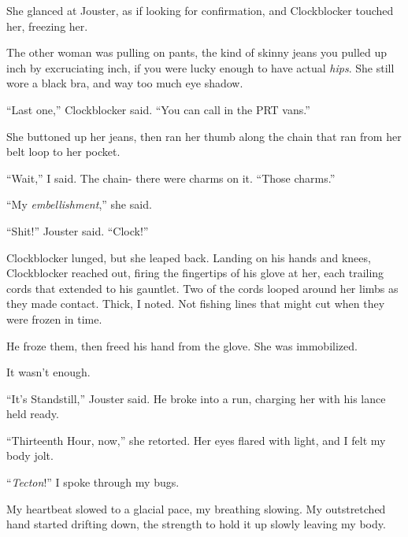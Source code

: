 She glanced at Jouster, as if looking for confirmation, and Clockblocker touched her, freezing her.



The other woman was pulling on pants, the kind of skinny jeans you pulled up inch by excruciating inch, if you were lucky enough to have actual \emph{hips}.  She still wore a black bra, and way too much eye shadow.



``Last one,'' Clockblocker said.  ``You can call in the PRT vans.''



She buttoned up her jeans, then ran her thumb along the chain that ran from her belt loop to her pocket.



``Wait,'' I said.  The chain- there were charms on it.  ``Those charms.''



``My \emph{embellishment},'' she said.



``Shit!'' Jouster said.  ``Clock!''



Clockblocker lunged, but she leaped back.  Landing on his hands and knees, Clockblocker reached out, firing the fingertips of his glove at her, each trailing cords that extended to his gauntlet.  Two of the cords looped around her limbs as they made contact.  Thick, I noted.  Not fishing lines that might cut when they were frozen in time.



He froze them, then freed his hand from the glove.  She was immobilized.



It wasn't enough.



``It's Standstill,'' Jouster said.  He broke into a run, charging her with his lance held ready.



``Thirteenth Hour, now,'' she retorted.  Her eyes flared with light, and I felt my body jolt.



``\emph{Tecton}!'' I spoke through my bugs.



My heartbeat slowed to a glacial pace, my breathing slowing.  My outstretched hand started drifting down, the strength to hold it up slowly leaving my body.



